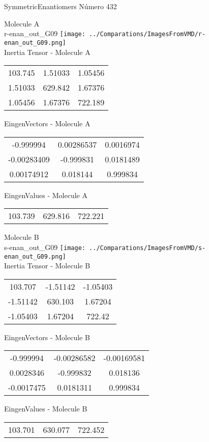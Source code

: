 \vtab[-2cm]
\begin{center}
{\large SymmetricEnantiomers \tab Número 432}
\end{center}
\begin{multicols}{2}
\begin{center}

Molecule A \\ 
r-enan\_out\_G09
\texttt{[image: ../Comparations/ImagesFromVMD/r-enan\_out\_G09.png]}
\\
Inertia Tensor - Molecule A \\
\vtab

\begin{tabular}{|c c c|}
103.745	 & 	1.51033	 & 	1.05456	 \\
1.51033	 & 	629.842	 & 	1.67376	 \\
1.05456	 & 	1.67376	 & 	722.189
\end{tabular}

\vtab
 EingenVectors - Molecule A     \\
\vtab
\begin{tabular}{|c c c|}
-0.999994	 & 	0.00286537	 & 	0.0016974	 \\
-0.00283409	 & 	-0.999831	 & 	0.0181489	 \\
0.00174912	 & 	0.018144	 & 	0.999834
\end{tabular}

\vtab
 EingenValues - Molecule A     \\
\vtab
\begin{tabular}{|c c c|}
103.739	 & 	629.816	 & 	722.221	 \\
\end{tabular}
\columnbreak

Molecule B \\ 
s-enan\_out\_G09
\texttt{[image: ../Comparations/ImagesFromVMD/s-enan\_out\_G09.png]}
\\
Inertia Tensor - Molecule B \\
\vtab

\begin{tabular}{|c c c|}
103.707	 & 	-1.51142	 & 	-1.05403	 \\
-1.51142	 & 	630.103	 & 	1.67204	 \\
-1.05403	 & 	1.67204	 & 	722.42
\end{tabular}

\vtab
 EingenVectors - Molecule B     \\
\vtab
\begin{tabular}{|c c c|}
-0.999994	 & 	-0.00286582	 & 	-0.00169581	 \\
0.0028346	 & 	-0.999832	 & 	0.018136	 \\
-0.0017475	 & 	0.0181311	 & 	0.999834
\end{tabular}

\vtab
 EingenValues - Molecule B     \\
\vtab
\begin{tabular}{|c c c|}
103.701	 & 	630.077	 & 	722.452	 \\
\end{tabular}

\end{center}
\end{multicols}
